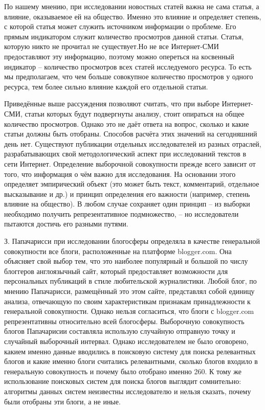 По нашему мнению, при исследовании новостных статей важна не сама статья, а влияние, оказываемое ей на общество. Именно это влияние и определяет степень, с которой статья может служить источником информации о проблеме. Его прямым индикатором служит количество просмотров данной статьи. Статья, которую никто не прочитал не существует.Но не все Интернет-СМИ предоставляют эту информацию, поэтому можно опереться на косвенный индикатор -- количество просмотров всех статей исследуемого ресурса. То есть мы предполагаем, что чем больше совокупное количество просмотров у одного ресурса, тем более сильно влияние каждой его отдельной статьи.

Приведённые выше рассуждения позволяют считать, что при выборе Интернет-СМИ, статьи которых будут подвергнуты анализу, стоит опираться на общее количество просмотров. Однако это не даёт ответа на вопрос, сколько и какие статьи должны быть отобраны. Способов расчёта этих значений на сегодняшний день нет. Существуют публикации отдельных исследователей из разных отраслей, разрабатывающих свой методологический аспект при исследований текстов в сети Интернет. Определение выборочной совокупности прежде всего зависит от того, что информация о чём важно для исследования. На основании этого определяет эмпирический объект (это может быть текст, комментарий, отдельное высказывание и др.) и принцип определения его важности (например, степень влияние на общество). В любом случае сохраняет один принцип -- из выборки необходимо получить репрезентативное подмножество, -- но исследователи пытаются достичь его разными путями.

З. Папачарисси при исследовании блогосферы определяла в качестве генеральной совокупности все блоги, расположенные на платформе blogger.com. Она объясняет свой выбор тем, что это наиболее популярный и большой по числу блоггеров англоязычный сайт, который предоставляет возможности для персональных публикаций в стиле любительской журналистики. Любой блог, по мнению Папачарисси, размещённый это этом сайте, представлял собой единицу анализа, отвечающую по своим характеристикам признакам принадлежности к генеральной совокупности. Однако нельзя согласиться, что блоги с blogger.com репрезентативны относительно всей блогосферы. Выборочную совокупность блогов Папачарисии составляла использую случайную отправную точку и случайный выборочный интервал. Однако исследователем не было оговорено, какием именно данные вводились в поисковую систему для поиска релевантных блогов и какие именно блоги считались релевантными, сколько блогов входило в генеральную совокупность и почему было отобрано именно 260. К тому же использование поисковых систем для поиска блогов выглядит сомнительно: алгоритмы данных систем неизвестны исследователю и нельзя сказать, почему были отобраны эти блоги, а не иные.

